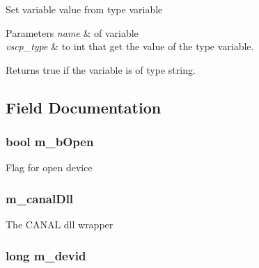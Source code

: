 \label{d5/d59/class_c_canal_super_wrapper_a97f97b04d5bbe9b4bd5b78cab5921f29}
Set variable value from type variable 
\begin{DoxyParams}{Parameters}
{\em name} & of variable \\
\hline
{\em vscp\_\-type} & to int that get the value of the type variable. \\
\hline
\end{DoxyParams}
\begin{DoxyReturn}{Returns}
true if the variable is of type string. 
\end{DoxyReturn}


\subsection{Field Documentation}
\hypertarget{class_c_canal_super_wrapper_aebec341755124a76eb58ca99e0e25a26}{
\subsubsection[{m\_\-bOpen}]{\setlength{\rightskip}{0pt plus 5cm}bool {\bf m\_\-bOpen}}}
\label{d5/d59/class_c_canal_super_wrapper_aebec341755124a76eb58ca99e0e25a26}
Flag for open device \hypertarget{class_c_canal_super_wrapper_a517088dbd5f8e695a336127ce68ba057}{
\subsubsection[{m\_\-canalDll}]{ {\bf m\_\-canalDll}}}
\label{d5/d59/class_c_canal_super_wrapper_a517088dbd5f8e695a336127ce68ba057}
The CANAL dll wrapper \hypertarget{class_c_canal_super_wrapper_a6f16be93eed366b6e545ccf469972f29}{
\subsubsection[{m\_\-devid}]{\setlength{\rightskip}{0pt plus 5cm}long {\bf m\_\-devid}}}
